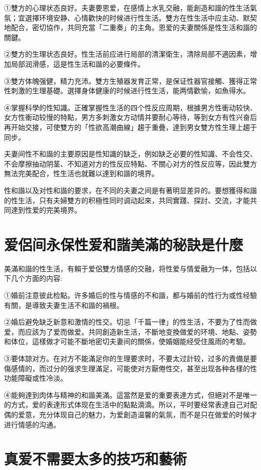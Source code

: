 \documentclass[12pt,UTF8]{ctexbook}
\begin{document}
①雙方的心理状态良好。夫妻要恩爱，在感情上水乳交融，能創造和諧的性生活氣氛；宜選擇环境安静、心情歡快的时候进行性生活。雙方在性生活中应主动、默契地配合，密切協作，共同充當「二重奏」的主角。恩爱的夫妻關係是性生活和諧的關鍵。

②雙方的生理状态良好。性生活前应进行局部的清潔衛生，清除局部不適因素，增加局部润滑感，這是性生活和諧的必要條件。

③雙方体魄强健，精力充沛。雙方生殖器发育正常，是保证性器官接觸、獲得正常性刺激的生理基礎。選擇身体健康的时候进行性生活，能两情歡愉，如魚得水。

④掌握科學的性知識。正確掌握性生活的四个性反应周期，根據男方性衝动较快、女方性衝动较慢的特點，男方多刺激女方动情并要耐心等待，等到女方有性兴奋后再开始交接，可使雙方的「性欲高潮曲線」趨于重疊，達到男女雙方性生理上趨于同步。

夫妻间性不和諧的主要原因是性知識的缺乏，例如缺乏必要的性知識、不会性交、不会摩擦抽动阴茎、不知道对方的性反应特點、不關心对方的性反应等，因此雙方無法完美配合，性生活也就難以達到和諧的境界。

性和諧以及对性和諧的要求，在不同的夫妻之间是有著明显差异的。要想獲得和諧的性生活，只有夫婦雙方的积極性同时调动起來，共同實踐、探討、交流，才能共同達到性爱的完美境界。

\section{爱侶间永保性爱和諧美滿的秘訣是什麼}

美滿和諧的性生活，有賴于爱侶雙方情感的交融，将性爱与情爱融为一体，包括以下几个方面的内容:

①婚前注意彼此检點。许多婚后的性与情感的不和諧，都与婚前的性行为或性经驗有關，是導致夫妻生活不和諧的禍根。

②婚后避免缺乏新意和激情的性交。切忌「千篇一律」的性生活，不要为了性而做爱，而应該为了爱而做爱。共同創造新生活，不斷地变換做爱的环境、地點、姿勢和体位，這樣做才可能不斷地密切夫妻间的關係，使婚姻能经受住風雨的考驗。

③要体諒对方。在对方不能滿足你的生理要求时，不要太过計较，过多的責備是要傷感情的，而过分的强求生理滿足，可能使对方厭倦性交，甚至出现各种各樣的性功能障礙或性冷淡。

④能夠達到肉体与精神的和諧美滿。這當然是爱的重要表達方式，但絕对不是唯一的方式，爱的表達形式体现在生活中的點點滴滴。所以，平时要经常表達自己对配偶的爱意，充分体现自己的魅力，为爱創造温馨的氣氛，而不是只在做爱的时候才进行情感的沟通。

\section{真爱不需要太多的技巧和藝術}
\end{document}
